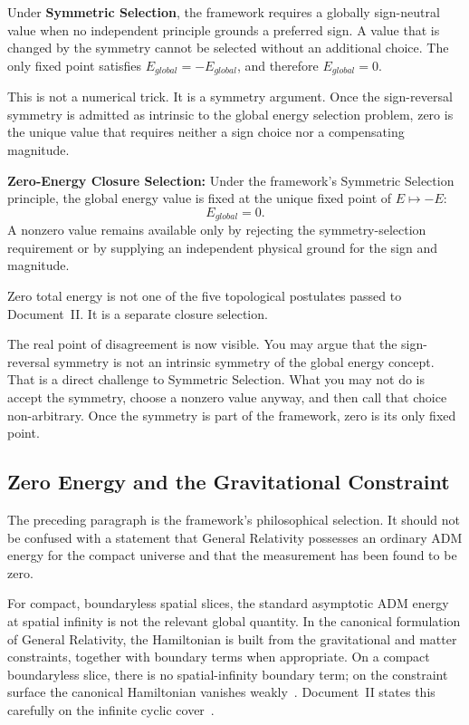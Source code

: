 \documentclass[11pt]{article}
\theoremstyle{canonstyle}
\def\mathrm#1{#1}%
\begin{document}
Under \textbf{Symmetric Selection}, the framework requires a globally sign-neutral value when no independent principle grounds a preferred sign. A value that is changed by the symmetry cannot be selected without an additional choice. The only fixed point satisfies $E_{\mathrm{global}} = -E_{\mathrm{global}}$, and therefore $E_{\mathrm{global}} = 0$.

This is not a numerical trick. It is a symmetry argument. Once the sign-reversal symmetry is admitted as intrinsic to the global energy selection problem, zero is the unique value that requires neither a sign choice nor a compensating magnitude.

\begin{keyresult}
\textbf{Zero-Energy Closure Selection:} Under the framework's Symmetric Selection principle, the global energy value is fixed at the unique fixed point of $E \mapsto -E$:
\[
E_{\mathrm{global}} = 0.
\]
A nonzero value remains available only by rejecting the symmetry-selection requirement or by supplying an independent physical ground for the sign and magnitude.
\end{keyresult}

Zero total energy is not one of the five topological postulates passed to Document~II. It is a separate closure selection.

\begin{ifyoudisagree}
The real point of disagreement is now visible. You may argue that the sign-reversal symmetry is not an intrinsic symmetry of the global energy concept. That is a direct challenge to Symmetric Selection. What you may not do is accept the symmetry, choose a nonzero value anyway, and then call that choice non-arbitrary. Once the symmetry is part of the framework, zero is its only fixed point.
\end{ifyoudisagree}

\subsection{Zero Energy and the Gravitational Constraint}

The preceding paragraph is the framework's philosophical selection. It should not be confused with a statement that General Relativity possesses an ordinary ADM energy for the compact universe and that the measurement has been found to be zero.

For compact, boundaryless spatial slices, the standard asymptotic ADM energy at spatial infinity is not the relevant global quantity. In the canonical formulation of General Relativity, the Hamiltonian is built from the gravitational and matter constraints, together with boundary terms when appropriate. On a compact boundaryless slice, there is no spatial-infinity boundary term; on the constraint surface the canonical Hamiltonian vanishes weakly~\cite{Wald,ADM}. Document~II states this carefully on the infinite cyclic cover~\cite{CanonWhat}.
\end{document}

